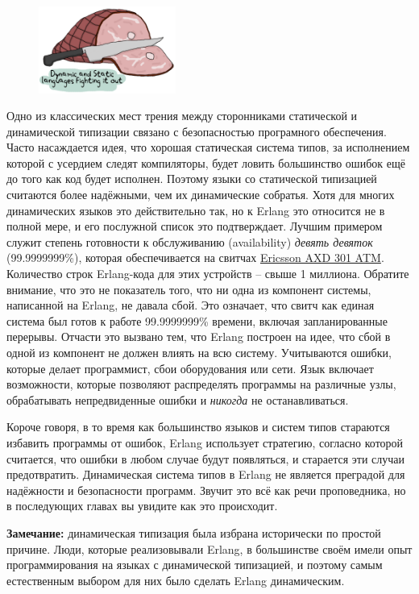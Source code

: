 \documentclass[a4paper,12pt]{report}
\begin{document}
\begin{figure}[h!]
    \includegraphics[width=0.4\textwidth]{ham.png}
\end{figure} 
Одно из классических мест трения между сторонниками статической и динамической типизации связано с безопасностью програмного обеспечения. Часто насаждается идея, что хорошая статическая система типов, за исполнением которой с усердием следят компиляторы, будет ловить большинство ошибок ещё до того как код будет исполнен. Поэтому языки со статической типизацией считаются более надёжными, чем их динамические собратья. Хотя для многих динамических языков это действительно так, но к Erlang это относится не в полной мере, и его послужной список это подтверждает. Лучшим примером служит степень готовности к обслуживанию (availability) \emph{девять девяток} (99.9999999\%), которая обеспечивается на свитчах \href{http://www.erlang.se/publications/Ulf_Wiger.pdf}{Ericsson AXD 301 ATM}. Количество строк Erlang\--кода для этих устройств \--- свыше 1 миллиона. Обратите внимание, что это не показатель того, что ни одна из компонент системы, написанной на Erlang, не давала сбой. Это означает, что свитч как единая система был готов к работе 99.9999999\% времени, включая запланированные перерывы. Отчасти это вызвано тем, что Erlang построен на идее, что сбой в одной из компонент не должен влиять на всю систему. Учитываются ошибки, которые делает программист, сбои оборудования или сети. Язык включает возможности, которые позволяют распределять программы на различные узлы, обрабатывать непредвиденные ошибки и \emph{никогда} не останавливаться.

Короче говоря, в то время как большинство языков и систем типов стараются избавить программы от ошибок, Erlang использует стратегию, согласно которой считается, что ошибки в любом случае будут появляться, и старается эти случаи предотвратить. Динамическая система типов в Erlang не является преградой для надёжности и безопасности программ. Звучит это всё как речи проповедника, но в последующих главах вы увидите как это происходит.\\
\colorbox{lgray}
{
    \begin{minipage}{\linewidth}
\textbf{Замечание:} динамическая типизация была избрана исторически по простой причине. Люди, которые реализовывали Erlang, в большинстве своём имели опыт программирования на языках с динамической типизацией, и поэтому самым естественным выбором для них было сделать Erlang динамическим.
    \end{minipage}
}
\end{document}
